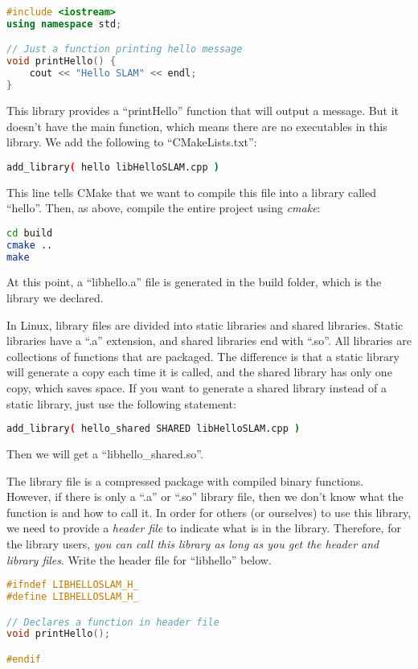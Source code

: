 \begin{lstlisting}[language=c++,caption=slambook2/ch2/libHelloSLAM.cpp]
#include <iostream>
using namespace std;

// Just a function printing hello message
void printHello() {
    cout << "Hello SLAM" << endl;
}
\end{lstlisting}
This library provides a ``printHello'' function that will output a message. But it doesn't have the main function, which means there are no executables in this library. We add the following to ``CMakeLists.txt'':
\begin{lstlisting}[language=sh,caption=slambook2/ch2/CMakeLists.txt]
add_library( hello libHelloSLAM.cpp )
\end{lstlisting}
This line tells CMake that we want to compile this file into a library called ``hello''. Then, as above, compile the entire project using \textit{cmake}:
\begin{lstlisting}[language=sh,caption=Terminal input]
cd build
cmake ..
make
\end{lstlisting}
At this point, a ``libhello.a'' file is generated in the build folder, which is the library we declared.

In Linux, library files are divided into static libraries and shared libraries. Static libraries have a ``.a'' extension, and shared libraries end with ``.so''. All libraries are collections of functions that are packaged. The difference is that a static library will generate a copy each time it is called, and the shared library has only one copy, which saves space. If you want to generate a shared library instead of a static library, just use the following statement:

\begin{lstlisting}[language=sh,caption=slambook2/ch2/CMakeLists.txt]
add_library( hello_shared SHARED libHelloSLAM.cpp )
\end{lstlisting}
Then we will get a ``libhello\_shared.so''.

The library file is a compressed package with compiled binary functions. However, if there is only a ``.a'' or ``.so'' library file, then we don't know what the function is and how to call it. In order for others (or ourselves) to use this library, we need to provide a \textit{header file} to indicate what is in the library. Therefore, for the library users, \textit{you can call this library as long as you get the header and library files}. Write the header file for ``libhello'' below.

\begin{lstlisting}[language=c++,caption=slambook2/ch2/libHelloSLAM.h]
#ifndef LIBHELLOSLAM_H_
#define LIBHELLOSLAM_H_

// Declares a function in header file
void printHello();

#endif
\end{lstlisting}


